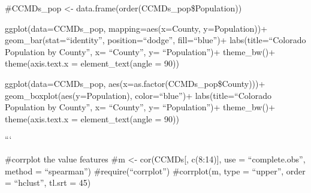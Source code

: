 \documentclass[]{article}
\begin{document}
\#CCMDs\_pop \textless{}- data.frame(order(CCMDs\_pop\$Population))

ggplot(data=CCMDs\_pop, mapping=aes(x=County, y=Population))+
geom\_bar(stat=``identity'', position=``dodge'', fill=``blue'')+
labs(title=``Colorado Population by County'', x= ``County'', y=
``Population'')+ theme\_bw()+ theme(axis.text.x = element\_text(angle =
90))

ggplot(data=CCMDs\_pop, aes(x=as.factor(CCMDs\_pop\$County)))+
geom\_boxplot(aes(y=Population), color=``blue'')+ labs(title=``Colorado
Population by County'', x= ``County'', y= ``Population'')+ theme\_bw()+
theme(axis.text.x = element\_text(angle = 90))

```

\#corrplot the value features \#m \textless{}- cor(CCMDs{[}, c(8:14){]},
use = ``complete.obs'', method = ``spearman'') \#require(``corrplot'')
\#corrplot(m, type = ``upper'', order = ``hclust'', tl.srt = 45)
\end{document}
